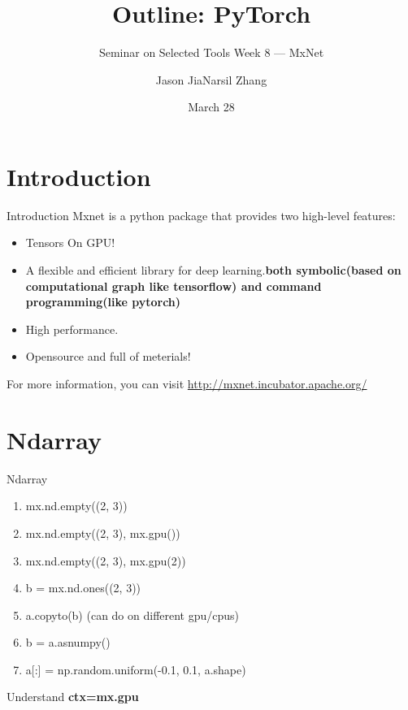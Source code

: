 \documentclass[english, nochinese]{../TeXTemplate/pkuslide}
\title{Outline: PyTorch}
\subtitle{Seminar on Selected Tools Week 8 --- MxNet}
\author{Jason Jia\qquad Narsil Zhang}
\date{March 28}
\begin{document}
\begin{frame}
\titlepage
\end{frame}

\begin{frame}
\tableofcontents[subsectionstyle=show]
\end{frame}

\section{Introduction}

\begin{frame}
\sectionpage
\end{frame}

\begin{frame}{Introduction}
Mxnet is a python package that provides two high-level features:
\begin{itemize}
\item Tensors On GPU!
\item A flexible and efficient library for deep learning.\textbf{both symbolic(based on computational graph like tensorflow) and command programming(like pytorch)}
\item High performance.
\item Opensource and full of meterials!
\end{itemize}
For more information, you can visit \url{http://mxnet.incubator.apache.org/}
\end{frame}

\section{Ndarray}

\begin{frame}
\sectionpage
\end{frame}

\begin{frame}{Ndarray}
\begin{enumerate}
\item mx.nd.empty((2, 3)) 
\item mx.nd.empty((2, 3), mx.gpu()) 
\item mx.nd.empty((2, 3), mx.gpu(2)) 
\item b = mx.nd.ones((2, 3))
\item a.copyto(b) (can do on different gpu/cpus)
\item b = a.asnumpy() 
\item a[:] = np.random.uniform(-0.1, 0.1, a.shape)  
\end{enumerate}

Understand \textbf{ctx=mx.gpu}
\end{frame}
\end{document}
